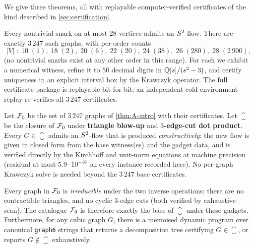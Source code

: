 We give three theorems, all with replayable computer-verified
certificates of the kind described in \cref{sec:certification}.

\begin{theorem}
\label{thm:A-intro}
Every nontrivial snark on at most $28$ vertices admits an
$S^{2}$-flow. There are exactly $3\,247$ such graphs, with
per-order counts
\[
   |V| \;:\; 10\;(1),\; 18\;(2),\; 20\;(6),\; 22\;(20),\;
            24\;(38),\; 26\;(280),\; 28\;(2\,900),
\]
(no nontrivial snarks exist at any other order in this range). For
each we exhibit a numerical witness, refine it to $50$ decimal digits
in $\mathbb{Q}[s]/(s^{2}-3)$, and certify uniqueness in an explicit interval
box by the Krawczyk operator. The full certificate package is
replayable bit-for-bit; an independent cold-environment replay
re-verifies all $3\,247$ certificates.
\end{theorem}

\begin{theorem}
\label{thm:B-intro}
Let $\mathcal{F}_0$ be the set of $3\,247$ graphs of \cref{thm:A-intro} with
their certificates. Let $\closure$ be the closure of $\mathcal{F}_0$ under
\textbf{triangle blow-up} and \textbf{$3$-edge-cut dot product}. Every
$G \in \closure$ admits an $S^{2}$-flow that is produced
\emph{constructively}: the new flow is given in closed form from the
base witness(es) and the gadget data, and is verified directly by the
Kirchhoff and unit-norm equations at machine precision (residual at
most $5.9 \cdot 10^{-16}$ on every instance recorded here). No
per-graph Krawczyk solve is needed beyond the $3\,247$ base
certificates.
\end{theorem}

\begin{theorem}
\label{thm:C-intro}
Every graph in $\mathcal{F}_0$ is \emph{irreducible} under the two inverse
operations: there are no contractible triangles, and no cyclic
$3$-edge cuts (both verified by exhaustive scan). The catalogue
$\mathcal{F}_0$ is therefore exactly the base of $\closure$ under these
gadgets. Furthermore, for any cubic graph $G$, there is a memoised
dynamic program over canonical \texttt{graph6} strings
that returns a decomposition tree certifying
$G \in \closure$, or reports $G \notin \closure$ exhaustively.
\end{theorem}

